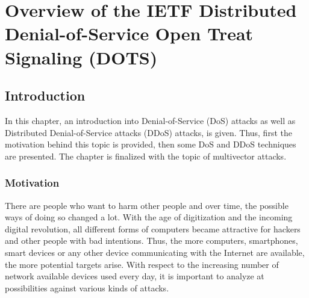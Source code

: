 \chapter{Overview of the IETF Distributed Denial-of-Service Open Treat Signaling (DOTS)}


\newpage

\minitoc %

\newpage

\section{Introduction}

In this chapter, an introduction into Denial-of-Service (DoS) attacks as well as Distributed Denial-of-Service attacks (DDoS) attacks, is given. Thus, first the motivation behind this topic is provided, then some DoS and DDoS techniques are presented. The chapter is finalized with the topic of multivector attacks.

\subsection{Motivation}

There are people who want to harm other people and over time, the possible ways of doing so changed a lot. With the age of digitization and the incoming digital revolution, all different forms of computers became attractive for hackers and other people with bad intentions. Thus, the more computers, smartphones, smart devices or any other device communicating with the Internet are available, the more potential targets arise. With respect to the increasing number of network available devices used every day, it is important to analyze at possibilities against various kinds of attacks.

